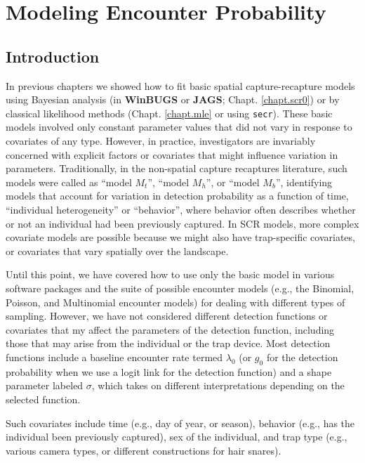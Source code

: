 \chapter{
Modeling Encounter Probability
}
\label{chapt.covariates}

\vspace{.3in}

\section{Introduction}

In previous chapters we showed how to fit basic spatial
capture-recapture models using Bayesian analysis (in {\bf WinBUGS} or
{\bf JAGS};
Chapt. \ref{chapt.scr0}) or by classical likelihood methods
(Chapt. \ref{chapt.mle} or using \mbox{\tt secr}).  These basic models involved only constant
parameter values that did not vary in response to covariates of any
type.  However, in practice, investigators are invariably concerned
with explicit factors or covariates that might influence variation in
parameters. Traditionally, in the non-spatial capture recaptures
literature, such models were called as ``model $M_t$'', ``model
$M_h$'', or ``model $M_b$'', identifying models that account for
variation in detection probability as a function of time, ``individual
heterogeneity'' or ``behavior'', where behavior often describes
whether or not an individual had been previously captured.  In SCR
models, more complex covariate models are possible because we might
also have trap-specific covariates, or covariates that vary spatially
over the landscape.

Until this point, we have covered how to use only the basic model in
various software packages and the suite of possible encounter models
(e.g., the Binomial, Poisson, and Multinomial encounter models) for
dealing with different types of sampling.  However, we have not
considered different detection functions or covariates that my affect
the parameters of the detection function, including those that may
arise from the individual or the trap device.  
Most detection functions include a baseline encounter
rate termed $\lambda_0$ (or $g_0$ for the detection probability when
we use a logit link for the detection function) and a shape parameter
labeled $\sigma$, which takes on different interpretations depending on
the selected function.  

 Such covariates
include time (e.g., day of year, or season), behavior (e.g., has the
individual been previously captured), sex of the individual, and trap
type (e.g., various camera types, or different constructions for hair
snares).

